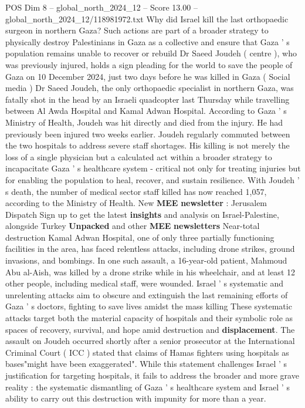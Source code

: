 \begin{textsample}{POS Dim 8 – global\_north\_2024\_12 – Score 13.00 – global\_north\_2024\_12/118981972.txt}  \label{ex:f8_pos_094}
Why did Israel kill the last orthopaedic surgeon in northern Gaza?
Such actions are part of a broader strategy to physically destroy Palestinians in Gaza as a collective and ensure that Gaza ' s population remains unable to recover or rebuild Dr Saeed Joudeh ( centre ), who was previously injured, holds a sign pleading for the world to save the people of Gaza on 10 December 2024, just two days before he was killed in Gaza ( Social media ) Dr Saeed Joudeh, the only orthopaedic specialist in northern Gaza, was fatally shot in the head by an Israeli quadcopter last Thursday while travelling between Al Awda Hospital and Kamal Adwan Hospital.
According to Gaza ' s Ministry of Health, Joudeh was hit directly and died from the injury.
He had previously been injured two weeks earlier.
Joudeh regularly commuted between the two hospitals to address severe staff shortages.
His killing is not merely the loss of a single physician but a calculated act within a broader strategy to incapacitate Gaza ' s healthcare system - critical not only for treating injuries but for enabling the population to heal, recover, and sustain resilience.
With Joudeh ' s death, the number of medical sector staff killed has now reached 1,057, according to the Ministry of Health.
New \textbf{MEE} \textbf{newsletter} : Jerusalem Dispatch Sign up to get the latest \textbf{insights} and analysis on Israel-Palestine, alongside Turkey \textbf{Unpacked} and other \textbf{MEE} \textbf{newsletters} Near-total destruction Kamal Adwan Hospital, one of only three partially functioning facilities in the area, has faced relentless attacks, including drone strikes, ground invasions, and bombings.
In one such assault, a 16-year-old patient, Mahmoud Abu al-Aish, was killed by a drone strike while in his wheelchair, and at least 12 other people, including medical staff, were wounded.
Israel ' s systematic and unrelenting attacks aim to obscure and extinguish the last remaining efforts of Gaza ' s doctors, fighting to save lives amidst the mass killing These systematic attacks target both the material capacity of hospitals and their symbolic role as spaces of recovery, survival, and hope amid destruction and \textbf{displacement}.
The assault on Joudeh occurred shortly after a senior prosecutor at the International Criminal Court ( ICC ) stated that claims of Hamas fighters using hospitals as bases"might have been exaggerated".
While this statement challenges Israel ' s justification for targeting hospitals, it fails to address the broader and more grave reality : the systematic dismantling of Gaza ' s healthcare system and Israel ' s ability to carry out this destruction with impunity for more than a year.

\end{textsample}

